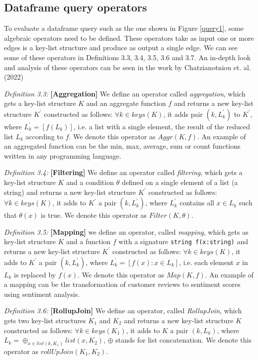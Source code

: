 \subsection{Dataframe query operators}

To evaluate a dataframe query such as the one shown in Figure \ref{query1}, some algebraic operators need to be defined. These operators take as input one or more edges is a key-list structure and produce as output a single edge. We can see some of these operators in Definitions 3.3, 3.4, 3.5, 3.6 and 3.7\cite{chatziantoniou}. An in-depth look and analysis of these operators can be seen in the work by Chatzianotniou et. al. (2022)\cite{chatziantoniou}

\textit{Definition 3.3:} \textbf{[Aggregation]} We define an operator called \textit{aggregation}, which gets a key-list structure \(K\) and an aggregate function \(f\) and returns a new key-list structure \(K^'\) constructed as follows: \(\forall k \in keys(K)\), it adds pair \((k, L_k^')\) to \(K^'\), where \(L_k^{'} = [f(L_k)]\), i.e. a list with a single element, the result of the reduced list \(L_k\) according to \(f\). We denote this operator as \(Aggr(K, f)\)\cite{chatziantoniou}. An example of an aggregated function can be the min, max, average, sum or count functions written in any programming language.

\textit{Definition 3.4:} \textbf{[Filtering]} We define an operator called \textit{filtering}, which gets a key-list structure \(K\) and a condition \(\theta\) defined on a single element of a list (a string) and returns a new key-list structure \(K^'\) constructed as follows: \(\forall k \in keys(K)\), it adds to \(K^'\) a pair \((k, L_k^{'})\), where \(L_k^'\) contains all \(x \in L_k\) such that \(\theta(x)\) is true. We denote this operator as \(Filter(K, \theta)\)\cite{chatziantoniou}.

\textit{Definition 3.5:} \textbf{[Mapping]} we define an operator, called \textit{mapping}, which gets as key-list structure \(K\) and a function \(f\) with a signature \texttt{string f(x:string)} and returns a new key-list structure \(K^'\) constructed as follows: \(\forall k \in keys(K)\), it adds to \(K^'\) a pair \((k, L_k^{'})\), where \(L_k^{'} = [f(x): x \in L_k]\), i.e. each element \(x\) in \(L_k\) is replaced by \(f(x)\). We denote this operator as \(Map(K, f)\)\cite{chatziantoniou}. An example of a mapping can be the transformation of customer reviews to sentiment scores using sentiment analysis.

\textit{Definition 3.6:} \textbf{[RollupJoin]} We define an operator, called \textit{RollupJoin}, which gets two key-list structures \(K_1\) and \(K_2\) and returns a new key-list structure \(K\) constructed as follows: \(\forall k \in keys(K_1)\), it adds to \(K\) a pair \((k, L_k)\), where \(L_k = \oplus_{x \in list(k, K_1)}list(x, K_2)\), \(\oplus\) stands for list concatenation. We denote this operator as \(rollUpJoin(K_1, K_2)\)\cite{chatziantoniou}.

